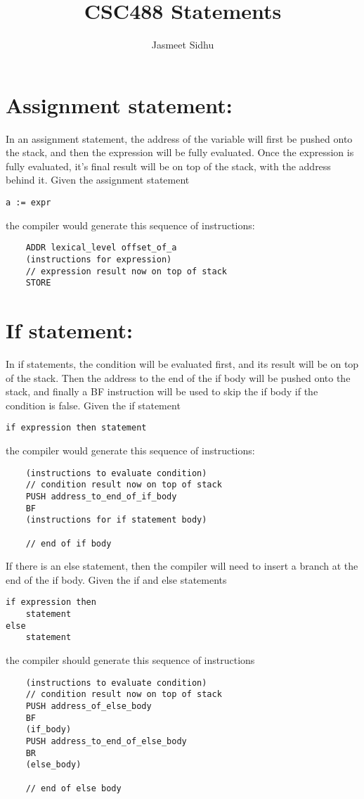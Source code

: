 \documentclass{article}
\author{Jasmeet Sidhu}
\title{CSC488 Statements}
\begin{document}
\maketitle


\section{Assignment statement:}
In an assignment statement, the address of the variable will first be pushed onto the stack,
and then the expression will be fully evaluated. Once the expression is fully evaluated, it's final result will be on top of the stack, with the address behind it.
\newline
\newline
Given the assignment statement
\begin{lstlisting}
a := expr
\end{lstlisting}
the compiler would generate this sequence of instructions:
\newline
\begin{lstlisting}
    ADDR lexical_level offset_of_a
    (instructions for expression)
    // expression result now on top of stack
    STORE
\end{lstlisting}

\section{If statement:}
In if statements, the condition will be evaluated first, and its result will be on top of the stack. Then the address to the end of the if body will be pushed onto the stack, and finally a BF instruction will be used to skip the if body if the condition is false.
\newline
\newline
Given the if statement
\begin{lstlisting}
if expression then statement
\end{lstlisting}
the compiler would generate this sequence of instructions:
\begin{lstlisting}
    (instructions to evaluate condition)
    // condition result now on top of stack
    PUSH address_to_end_of_if_body
    BF
    (instructions for if statement body)
    
    // end of if body
\end{lstlisting}

\noindent
If there is an else statement, then the compiler will need to insert a branch at the end of the if body.
\newline
Given the if and else statements
\begin{lstlisting}
if expression then
    statement
else
    statement
\end{lstlisting}
the compiler should generate this sequence of instructions
\begin{lstlisting}
    (instructions to evaluate condition)
    // condition result now on top of stack
    PUSH address_of_else_body
    BF
    (if_body)
    PUSH address_to_end_of_else_body
    BR
    (else_body)
    
    // end of else body
\end{lstlisting}
\end{document}
